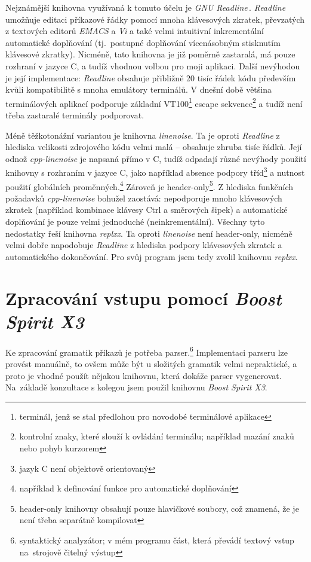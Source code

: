 \documentclass[thesis=B,czech,hidelinks]{FITthesis}[2019/03/06]
\newcommand{\Rplus}{\protect\hspace{-.1em}\protect\raisebox{.35ex}{\smaller{\smaller\textbf{+}}}}
\newcommand{\Cpp}{\mbox{C\Rplus\Rplus}\xspace}
\begin{document}
Nejznámější knihovna využívaná k tomuto účelu je \textit{GNU Readline}\,\cite{readline}. \textit{Readline} umožňuje editaci příkazové řádky pomocí mnoha klávesových zkratek, převzatých z textových editorů \textit{EMACS} a \textit{Vi} a také velmi intuitivní inkrementální automatické doplňování (tj.\ postupné doplňování vícenásobným stisknutím klávesové zkratky). Nicméně, tato knihovna je již poměrně zastaralá, má pouze rozhraní v jazyce C, a tudíž vhodnou volbou pro moji aplikaci. Další nevýhodou je její implementace: \textit{Readline} obsahuje přibližně 20 tisíc řádek kódu především kvůli kompatibilitě s mnoha emulátory terminálů. V dnešní době většina terminálových aplikací podporuje základní VT100\footnote{terminál, jenž se stal předlohou pro novodobé terminálové aplikace} escape sekvence\footnote{kontrolní znaky, které slouží k ovládání terminálu; například mazání znaků nebo pohyb kurzorem} a tudíž není třeba zastaralé terminály podporovat.\cite{linenoise-readme}

Méně těžkotonážní variantou je knihovna \textit{linenoise}. Ta je oproti \textit{Readline} z hlediska velikosti zdrojového kódu velmi malá -- obsahuje zhruba tisíc řádků. Její odnož \textit{cpp-linenoise} je napsaná přímo v \Cpp{}, tudíž odpadají různé nevýhody použití knihovny s rozhraním v jazyce C, jako například absence podpory tříd\footnote{jazyk C není objektově orientovaný} a nutnost použití globálních proměnných.\footnote{například k definování funkce pro automatické doplňování} Zároveň je header-only\footnote{header-only knihovny obsahují pouze hlavičkové soubory, což znamená, že je není třeba separátně kompilovat}. Z hlediska funkčních požadavků \textit{cpp-linenoise} bohužel zaostává: nepodporuje mnoho klávesových zkratek (například kombinace klávesy Ctrl a směrových šipek) a automatické doplňování je pouze velmi jednoduché (neinkrementální). Všechny tyto nedostatky řeší knihovna \textit{replxx}. Ta oproti \textit{linenoise} není header-only, nicméně velmi dobře napodobuje \textit{Readline} z hlediska podpory klávesových zkratek a automatického dokončování. Pro svůj program jsem tedy zvolil knihovnu \textit{replxx}.

\section{Zpracování vstupu pomocí \textit{Boost Spirit X3}}\label{spirit:intro}
Ke zpracování gramatik příkazů je potřeba parser.\footnote{syntaktický analyzátor; v mém programu část, která převádí textový vstup na~strojově čitelný výstup} Implementaci parseru lze provést manuálně, to ovšem může být u složitých gramatik velmi nepraktické, a proto je vhodné použít nějakou knihovnu, která dokáže parser vygenerovat. Na~základě konzultace s kolegou jsem použil knihovnu \textit{Boost Spirit X3}.
\end{document}
